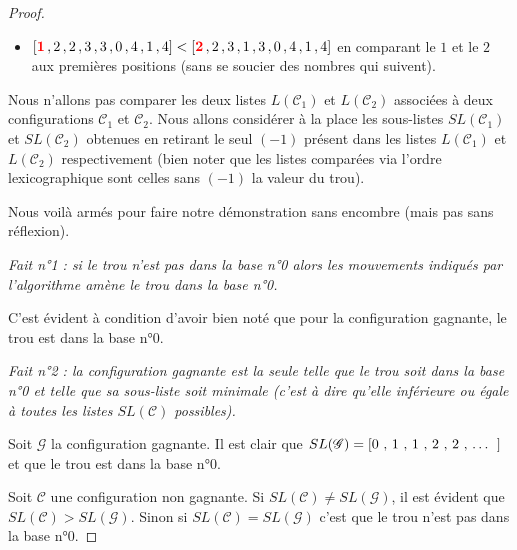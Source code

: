 \begin{proof}
\begin{itemize}
		\medskip

		\item[\textbullet] $[\text{\color{red} \textbf{1}} \, , 2 \, , 2 \, , 3 \, , 3 \, , 0 \, , 4 \, , 1 \, , 4] < [\text{\color{red} \textbf{2}} \, , 2 \, , 3 \, , 1 \, , 3 \, , 0 \, , 4 \, , 1 \, , 4]$
		en comparant le $1$ et le $2$ aux premières positions (sans se soucier des nombres qui suivent).
	\end{itemize}


	\medskip

	Nous n'allons pas comparer les deux listes $L(\mathscr{C}_1)$ et $L(\mathscr{C}_2)$ associées à deux configurations $\mathscr{C}_1$ et $\mathscr{C}_2$. Nous allons considérer à la place les sous-listes $SL(\mathscr{C}_1)$ et $SL(\mathscr{C}_2)$ obtenues en retirant le seul $(-1)$ présent dans les listes $L(\mathscr{C}_1)$ et $L(\mathscr{C}_2)$ respectivement (bien noter que les listes comparées via l'ordre lexicographique sont celles sans $(-1)$ la valeur du trou).
		
	
	\medskip

	Nous voilà armés pour faire notre démonstration sans encombre (mais pas sans réflexion).


	\medskip

	\textit{Fait n°1 : si le trou n'est pas dans la base n°0 alors les mouvements indiqués par l'algorithme amène le trou dans la base n°0.}


	\medskip
	
	C'est évident à condition d'avoir bien noté que pour la configuration gagnante, le trou est dans la base n°0.


	\medskip

	\textit{Fait n°2 : la configuration gagnante est la seule telle que le trou soit dans la base n°0 et telle que sa sous-liste soit minimale (c'est à dire qu'elle inférieure ou égale à toutes les listes $SL(\mathscr{C})$ possibles).}


	\medskip

	Soit $\mathscr{G}$ la configuration gagnante. Il est clair que
	$SL(\mathscr{G}) = \text{[0 , 1 , 1 , 2 , 2 , \dots{} ]}$
	et que le trou est dans la base n°0.


	\medskip

	Soit $\mathscr{C}$ une configuration non gagnante. Si $SL(\mathscr{C}) \neq SL(\mathscr{G})$, il est évident que $SL(\mathscr{C}) > SL(\mathscr{G})$. Sinon si $SL(\mathscr{C}) = SL(\mathscr{G})$ c'est que le trou n'est pas dans la base n°0.
	
	
	\medskip


\end{proof}
